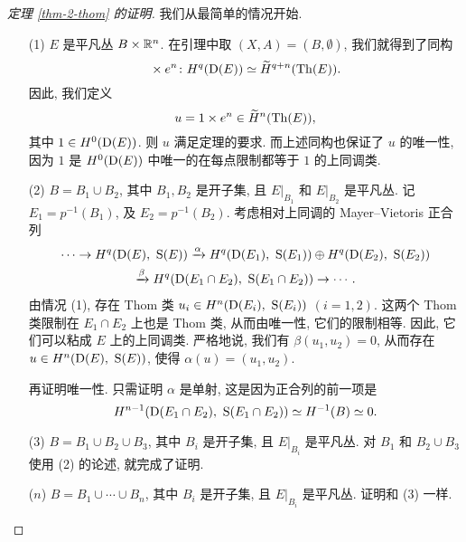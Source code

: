 \begin{proof}[定理 \ref{thm-2-thom} 的证明]
    我们从最简单的情况开始.

    \begin{itemize}
        \item[(1)] 
            $E$ 是平凡丛 $B \times \mathbb{R}^n$.
            在引理中取 $(X, A) = (B, \emptyset)$,
            我们就得到了同构
            \[ {} \times e^n \colon H^q (\mathrm{D}(E)) \simeq \widetilde{H}^{q+n} (\mathrm{Th}(E)). \]
            因此, 我们定义
            \[ u = 1 \times e^n \in \widetilde{H}^n(\mathrm{Th}(E)), \]
            其中 $1 \in H^0(\mathrm{D}(E))$.
            则 $u$ 满足定理的要求.
            而上述同构也保证了 $u$ 的唯一性,
            因为 $1$ 是 $H^0(\mathrm{D}(E))$ 中唯一的在每点限制都等于 $1$ 的上同调类.

        \item[(2)]
            $B = B_1 \cup B_2$, 其中 $B_1, B_2$ 是开子集,
            且 $E|_{B_1}$ 和 $E|_{B_2}$ 是平凡丛.
            记 $E_1 = p^{-1}(B_1)$, 及 $E_2 = p^{-1}(B_2)$.
            考虑相对上同调的 Mayer--Vietoris 正合列
            \begin{multline*}
                \cdots \to H^q(\mathrm{D}(E),\ \mathrm{S}(E))
                \xrightarrow{\alpha} H^q(\mathrm{D}(E_1),\ \mathrm{S}(E_1))
                \oplus H^q(\mathrm{D}(E_2),\ \mathrm{S}(E_2)) \\
                \xrightarrow{\beta} H^q(\mathrm{D}(E_1 \cap E_2),\ \mathrm{S}(E_1 \cap E_2)) \to \cdots.
            \end{multline*}
            由情况 (1), 存在 Thom 类 $u_i \in H^n(\mathrm{D}(E_i),\ \mathrm{S}(E_i))$ $(i=1,2)$.
            这两个 Thom 类限制在 $E_1 \cap E_2$ 上也是 Thom 类, 从而由唯一性, 它们的限制相等.
            因此, 它们可以粘成 $E$ 上的上同调类. 严格地说, 我们有 $\beta(u_1, u_2) = 0$,
            从而存在 $u \in H^n(\upD(E),\ \upS(E))$, 使得 $\alpha(u) = (u_1, u_2)$.

            再证明唯一性. 只需证明 $\alpha$ 是单射,
            这是因为正合列的前一项是 
            \[ H^{n - 1} (\mathrm{D}(E_1 \cap E_2),\ \mathrm{S}(E_1 \cap E_2)) \simeq H^{-1}(B) \simeq 0. \]

        \item[(3)]
            $B = B_1 \cup B_2 \cup B_3$, 其中 $B_i$ 是开子集,
            且 $E|_{B_i}$ 是平凡丛. 对 $B_1$ 和 $B_2 \cup B_3$ 使用 (2) 的论述,
            就完成了证明.

        \item[($n$)]
            $B = B_1 \cup \cdots \cup B_n$, 其中 $B_i$ 是开子集,
            且 $E|_{B_i}$ 是平凡丛. 证明和 (3) 一样.


\end{itemize}
\end{proof}
